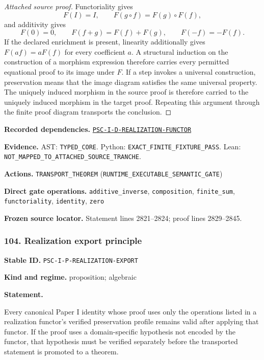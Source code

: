 \documentclass[a4paper,11pt]{article}
\newcommand{\field}[2]{\noindent\textbf{#1.} #2\par}
\begin{document}
\begin{proof}[Attached source proof]
Functoriality gives
\[
F(I)=I,
\qquad
F(g\circ f)=F(g)\circ F(f),
\]
and additivity gives
\[
F(0)=0,
\qquad
F(f+g)=F(f)+F(g),
\qquad
F(-f)=-F(f).
\]
If the declared enrichment is present, linearity additionally gives $F(af)=aF(f)$ for every coefficient $a$.  A structural induction on the construction of a morphism expression therefore carries every permitted equational proof to its image under $F$.  If a step invokes a universal construction, preservation means that the image diagram satisfies the same universal property.  The uniquely induced morphism in the source proof is therefore carried to the uniquely induced morphism in the target proof.  Repeating this argument through the finite proof diagram transports the conclusion.
\end{proof}
\field{Recorded dependencies}{\hyperref[rec:PSC-I-D-REALIZATION-FUNCTOR]{\nolinkurl{PSC-I-D-REALIZATION-FUNCTOR}}}
\field{Evidence}{AST: \nolinkurl{TYPED_CORE}. Python: \nolinkurl{EXACT_FINITE_FIXTURE_PASS}. Lean: \nolinkurl{NOT_MAPPED_TO_ATTACHED_SOURCE_TRANCHE}.}
\field{Actions}{\nolinkurl{TRANSPORT_THEOREM} (\nolinkurl{RUNTIME_EXECUTABLE_SEMANTIC_GATE})}
\field{Direct gate operations}{\nolinkurl{additive_inverse}, \nolinkurl{composition}, \nolinkurl{finite_sum}, \nolinkurl{functoriality}, \nolinkurl{identity}, \nolinkurl{zero}}
\field{Frozen source locator}{Statement lines 2821--2824; proof lines 2829--2845.}
\subsubsection*{104. Realization export principle}
\label{rec:PSC-I-P-REALIZATION-EXPORT}
\field{Stable ID}{\nolinkurl{PSC-I-P-REALIZATION-EXPORT}}
\field{Kind and regime}{proposition; algebraic}
\textbf{Statement.}\par
Every canonical Paper I identity whose proof uses only the operations listed in a realization functor's verified preservation profile remains valid after applying that functor.  If the proof uses a domain-specific hypothesis not encoded by the functor, that hypothesis must be verified separately before the transported statement is promoted to a theorem.
\end{document}
